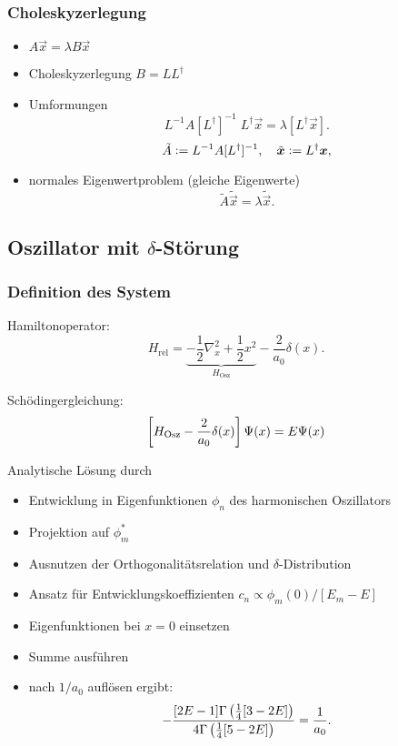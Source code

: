 \documentclass[ngerman, fleqn]{beamer}
\begin{document}
\begin{frame}
    \frametitle{Choleskyzerlegung}

    \begin{itemize}
        \item
            $A \vec x = \lambda B \vec x$

        \item
            Choleskyzerlegung $B = L L^\dagger$ 

        \item
            Umformungen
            \[
                L^{-1} A [L^\dagger]^{-1} \; L^\dagger \vec x
                =
                \lambda [L^\dagger \vec x].
            \]
            \[
                \tilde{A} := L^{-1} A [L^\dagger]^{-1}
                ,\quad
                \tilde{\boldsymbol{x}} := L^\dagger \boldsymbol{x},
            \]

        \item
            normales Eigenwertproblem (gleiche Eigenwerte)
            \[
                \tilde{A} \tilde{\vec x} = \lambda \tilde{\vec x}.
            \]
    \end{itemize}
\end{frame}

\subsection{Oszillator mit $\delta$-Störung}

\frame\subsectionpage

\begin{frame}
    \frametitle{Definition des System}

    Hamiltonoperator:
    \[
        H_\text{rel} = \underbrace{- \frac12 \nabla_x^2 + \frac 12
        x^2}_{H_\text{Osz}} - \frac2{a_0} \delta(x).
    \]

    Schödingergleichung:
    \[
        \sbr{H_\text{Osz} - \frac2{a_0} \delta(x)} \Psi(x) = E \Psi(x)
    \]

    Analytische Lösung durch \cite{Busch/Two_Cold}
\end{frame}

\begin{frame}
    \begin{itemize}
        \item
            Entwicklung in Eigenfunktionen $\phi_n$ des harmonischen Oszillators
        \item
            Projektion auf $\phi_m^*$
        \item
            Ausnutzen der Orthogonalitätsrelation und $\delta$-Distribution
        \item
            Ansatz für Entwicklungskoeffizienten $c_n \propto \phi_m(0)/[E_m - E]$
        \item
            Eigenfunktionen bei $x = 0$ einsetzen
        \item
            Summe ausführen
        \item
            nach $1/a_0$ auflösen ergibt:
            \[
                - \frac{[2E-1]\Gamma\del{\frac 14[3-2E]}}{4 \Gamma\del{\frac
                14[5-2E]}} = \frac1{a_0}.
            \]
    \end{itemize}
\end{frame}
\end{document}
